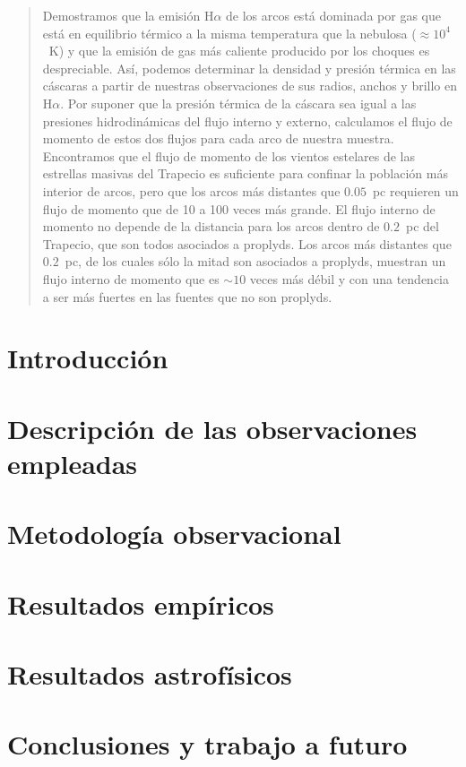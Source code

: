 \documentclass{report}
\begin{document}
\begin{abstract}
  Demostramos que la emisión H$\alpha$ de los arcos está dominada por
  gas que está en equilibrio térmico a la misma temperatura que la
  nebulosa ($\approx 10^4$~K) y que la emisión de gas más caliente
  producido por los choques es despreciable.  Así, podemos determinar
  la densidad y presión térmica en las cáscaras a partir de nuestras
  observaciones de sus radios, anchos y brillo en H$\alpha$.  Por
  suponer que la presión térmica de la cáscara sea igual a las
  presiones hidrodinámicas del flujo interno y externo, calculamos el
  flujo de momento de estos dos flujos para cada arco de nuestra
  muestra.  Encontramos que el flujo de momento de los vientos
  estelares de las estrellas masivas del Trapecio es suficiente para
  confinar la población más interior de arcos, pero que los arcos más
  distantes que $0.05$~pc requieren un flujo de momento que de 10 a
  100 veces más grande.  El flujo interno de momento no depende de la
  distancia para los arcos dentro de $0.2$~pc del Trapecio, que son
  todos asociados a proplyds.  Los arcos más distantes que $0.2$~pc,
  de los cuales sólo la mitad son asociados a proplyds,
  muestran un flujo interno de momento que es $\sim 10$ veces más
  débil y con una tendencia a ser más fuertes en las fuentes que no
  son proplyds.
\end{abstract}


\chapter{Introducción}

\chapter{Descripción de las observaciones empleadas}

\chapter{Metodología observacional}

\chapter{Resultados empíricos}

\chapter{Resultados astrofísicos}

\chapter{Conclusiones y trabajo a futuro}



\end{document}
